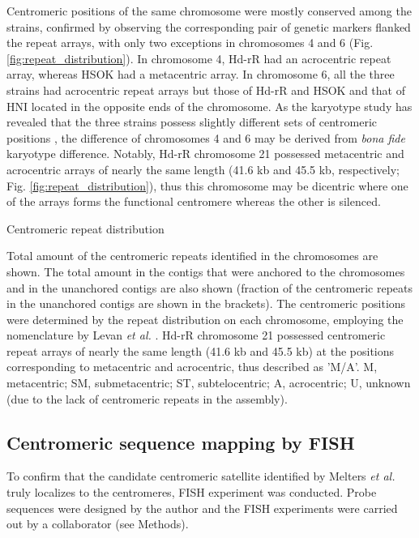   Centromeric positions of the same chromosome were mostly conserved among the strains, confirmed by observing the corresponding pair of genetic markers flanked the repeat arrays, with only two exceptions in chromosomes 4 and 6 (Fig. \ref{fig:repeat_distribution}). In chromosome 4, Hd-rR had an acrocentric repeat array, whereas HSOK had a metacentric array. In chromosome 6, all the three strains had acrocentric repeat arrays but those of Hd-rR and HSOK and that of HNI located in the opposite ends of the chromosome. As the karyotype study has revealed that the three strains possess slightly different sets of centromeric positions \cite{Uwa1990}, the difference of chromosomes 4 and 6 may be derived from \textit{bona fide} karyotype difference. Notably, Hd-rR chromosome 21 possessed metacentric and acrocentric arrays of nearly the same length (41.6 kb and 45.5 kb, respectively; Fig. \ref{fig:repeat_distribution}), thus this chromosome may be dicentric where one of the arrays forms the functional centromere whereas the other is silenced.

  \begin{table*}[htp]
    \centering
    \caption{Centromeric repeat distribution}
    
    \label{centromeric_repeat_distribution}
    \caption*{{\small
      Total amount of the centromeric repeats identified in the chromosomes are shown. The total amount in the contigs that were anchored to the chromosomes and in the unanchored contigs are also shown (fraction of the centromeric repeats in the unanchored contigs are shown in the brackets). The centromeric positions were determined by the repeat distribution on each chromosome, employing the nomenclature by Levan \textit{et al.} \cite{levan1964}. Hd-rR chromosome 21 possessed centromeric repeat arrays of nearly the same length (41.6 kb and 45.5 kb) at the positions corresponding to metacentric and acrocentric, thus described as 'M/A'. M, metacentric; SM, submetacentric; ST, subtelocentric; A, acrocentric; U, unknown (due to the lack of centromeric repeats in the assembly).
    }}
  \end{table*}


\subsection*{Centromeric sequence mapping by FISH}
  To confirm that the candidate centromeric satellite identified by Melters \textit{et al.} \cite{Melters2013} truly localizes to the centromeres, FISH experiment was conducted. Probe sequences were designed by the author and the FISH experiments were carried out by a collaborator (see Methods).

